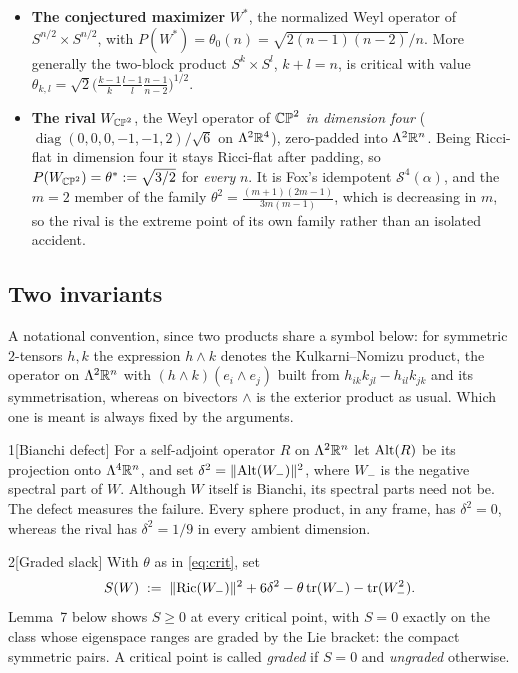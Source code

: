 \begin{itemize}[leftmargin=1.4em]
\item \textbf{The conjectured maximizer} $W^{*}$, the normalized Weyl operator of $S^{n/2}\times S^{n/2}$, with $P(W^{*})=\theta_0(n)=\sqrt{2(n-1)(n-2)}/n$. More generally the two-block product $S^k\times S^l$, $k+l=n$, is critical with value $\theta_{k,l}=\sqrt2\big(\tfrac{k-1}{k}\tfrac{l-1}{l}\tfrac{n-1}{n-2}\big)^{1/2}$.
\item \textbf{The rival} $W_{\mathbb{CP}^2}$, the Weyl operator of $\mathbb{CP}^2$ \emph{in dimension four} ($\operatorname{diag}(0,0,0,-1,-1,2)/\sqrt6$ on $\Lambda^2\mathbb{R}^4$), zero-padded into $\Lambda^2\mathbb{R}^n$. Being Ricci-flat in dimension four it stays Ricci-flat after padding, so $P(W_{\mathbb{CP}^2})=\theta^{*}:=\sqrt{3/2}$ for \emph{every} $n$. It is Fox's idempotent $\mathcal S^4(\alpha)$, and the $m=2$ member of the family $\theta^2=\tfrac{(m+1)(2m-1)}{3m(m-1)}$, which is decreasing in $m$, so the rival is the extreme point of its own family rather than an isolated accident.
\end{itemize}

\subsection{Two invariants}

A notational convention, since two products share a symbol below: for symmetric $2$-tensors $h,k$ the expression $h\wedge k$ denotes the Kulkarni--Nomizu product, the operator on $\Lambda^2\mathbb{R}^n$ with $(h\wedge k)(e_i\wedge e_j)$ built from $h_{ik}k_{jl}-h_{il}k_{jk}$ and its symmetrisation, whereas on bivectors $\wedge$ is the exterior product as usual. Which one is meant is always fixed by the arguments.

\begin{Defn}{1}[Bianchi defect]
For a self-adjoint operator $R$ on $\Lambda^2\mathbb{R}^n$ let $\mathrm{Alt}(R)$ be its projection onto $\Lambda^4\mathbb{R}^n$, and set $\delta^2=\|\mathrm{Alt}(W_-)\|^2$, where $W_-$ is the negative spectral part of $W$. Although $W$ itself is Bianchi, its spectral parts need not be. The defect measures the failure. Every sphere product, in any frame, has $\delta^2=0$, whereas the rival has $\delta^2=1/9$ in every ambient dimension.
\end{Defn}

\begin{Defn}{2}[Graded slack]
With $\theta$ as in \eqref{eq:crit}, set
\[
S(W)\;:=\;\|\mathrm{Ric}(W_-)\|^2+6\delta^2-\theta\operatorname{tr}(W_-)-\operatorname{tr}(W_-^2).
\]
Lemma~7 below shows $S\ge0$ at every critical point, with $S=0$ exactly on the class whose eigenspace ranges are graded by the Lie bracket: the compact symmetric pairs. A critical point is called \emph{graded} if $S=0$ and \emph{ungraded} otherwise.
\end{Defn}

